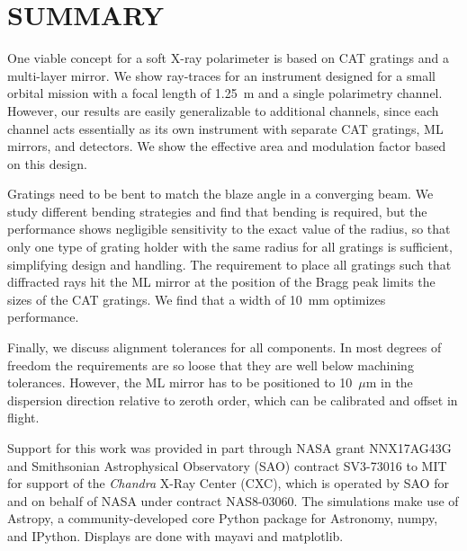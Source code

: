 \documentclass[]{spie}  %
\begin{document}
\section{SUMMARY}
\label{sect:summary}
One viable concept for a soft X-ray polarimeter is based on CAT
gratings and a multi-layer mirror. We show ray-traces for an
instrument designed for a small orbital mission with a focal length of
1.25~m and a single polarimetry channel. However, our results are
easily generalizable to additional channels, since each channel acts
essentially as its own instrument with separate CAT gratings, ML
mirrors, and detectors. We show the effective area and modulation factor
based on this design.

Gratings need to be bent to match the blaze angle in a converging
beam. We study different bending strategies and find that bending is
required, but the performance shows negligible sensitivity to the
exact value of the radius, so that only one type of grating holder
with the same radius for all gratings is sufficient, simplifying
design and handling. The requirement to place all gratings such that
diffracted rays hit the ML mirror at the position of the Bragg peak
limits the sizes of the CAT gratings. We find that a width of
10~mm optimizes performance.

Finally, we discuss alignment tolerances for all components. In most
degrees of freedom the requirements are so loose that they are well
below machining tolerances. However, the ML mirror
has to be positioned to 10~$\mu$m in the dispersion direction
relative to zeroth order, which can be calibrated and offset in flight.

\acknowledgments %
Support
for this work was provided in part through NASA grant NNX17AG43G and
Smithsonian Astrophysical Observatory (SAO) contract SV3-73016 to MIT
for support of the {\em Chandra} X-Ray Center (CXC), which is operated
by SAO for and on behalf of NASA under contract NAS8-03060.  The
simulations make use of Astropy, a community-developed core Python
package for Astronomy\cite{astropy1,astropy2}, numpy\cite{numpy}, and
IPython\cite{IPython}. Displays are done with mayavi\cite{mayavi} and
matplotlib\cite{matplotlib}.


\end{document}
